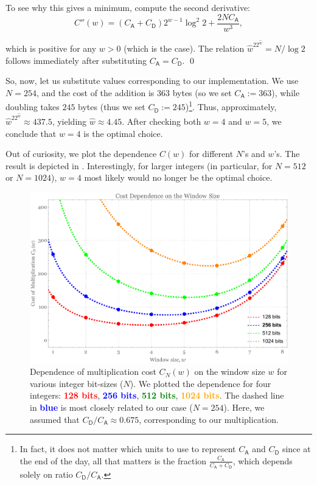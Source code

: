 \documentclass{iacrtrans}
\begin{document}
To see why this gives a minimum, compute the second derivative:
\begin{equation}
    C''(w) = (C_{\mathsf{A}}+C_{\mathsf{D}})2^{w-1}\log^2 2 + \frac{2NC_{\mathsf{A}}}{w^3},
\end{equation}

which is positive for any $w>0$ (which is the case). The relation $\hat{w}^22^{\hat{w}}=N/\log 2$ follows immediately after substituting $C_{\mathsf{A}} = C_{\mathsf{D}}$. \qed

So, now, let us substitute values corresponding to our implementation. We use $N=254$, and the cost of the addition is $363$ bytes (so we set $C_{\mathsf{A}}:=363$), while doubling takes $245$ bytes (thus we set $C_{\mathsf{D}}:= 245$)\footnote{In fact, it does not matter which units to use to represent $C_{\mathsf{A}}$ and $C_{\mathsf{D}}$ since at the end of the day, all that matters is the fraction $\frac{C_{\mathsf{A}}}{C_{\mathsf{A}}+C_{\mathsf{D}}}$, which depends solely on ratio $C_{\mathsf{D}}/C_{\mathsf{A}}$.}. Thus, approximately, $\hat{w}^22^{\hat{w}} \approx 437.5$, yielding $\hat{w} \approx 4.45$. After checking both $w=4$ and $w=5$, we conclude that $w=4$ is the optimal choice.

Out of curiosity, we plot the dependence $C(w)$ for different $N$'s and $w$'s. The result is depicted in . Interestingly, for larger integers (in particular, for $N=512$ or $N=1024$), $w=4$ most likely would no longer be the optimal choice.

\begin{figure}[h]
    \centering
    \includegraphics[width=0.75\linewidth]{window_dependence.pdf}
    \caption{Dependence of multiplication cost $C_N(w)$ on the window size $w$ for various integer bit-sizes ($N$). We plotted the dependence for four integers: \textbf{\textcolor{red}{128 bits}}, \textbf{\textcolor{blue}{256 bits}}, \textbf{\textcolor{green}{512 bits}}, \textbf{\textcolor{orange}{1024 bits}}. The dashed line in \textbf{\textcolor{blue}{blue}} is most closely related to our case ($N=254$). Here, we assumed that $C_{\mathsf{D}}/C_{\mathsf{A}} \approx 0.675$, corresponding to our multiplication.}
    \label{fig:w_dependence}
\end{figure}
\end{document}
